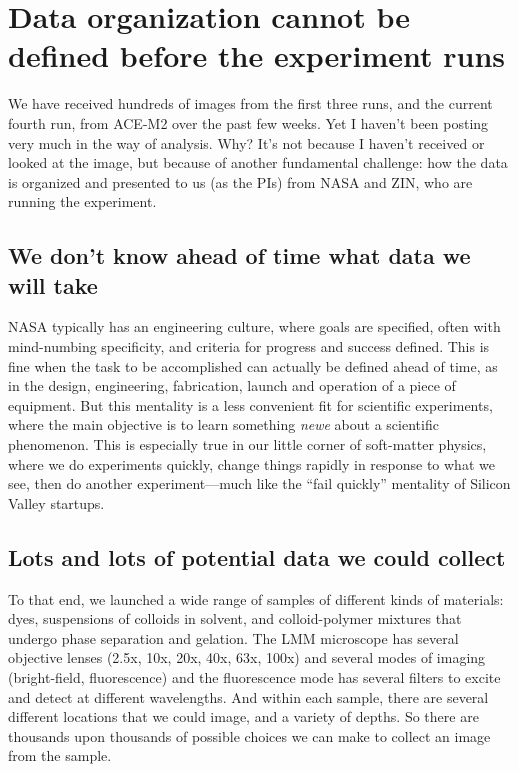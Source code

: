 \section{Data organization cannot be defined before the experiment runs}\hypertarget{data-organization-cannot-be-defined-before-the-experiment-runs}{}\label{data-organization-cannot-be-defined-before-the-experiment-runs}
We have received hundreds of images from the first three runs, and the current
fourth run, from ACE-M2 over the past few weeks. Yet I haven't been posting very
much in the way of analysis. Why? It's not because I haven't received or looked
at the image, but because of another fundamental challenge: how the data is
organized and presented to us (as the PIs) from NASA and ZIN, who are running
the experiment.

\subsection{We don't know ahead of time what data we will take}\hypertarget{we-dont-know-ahead-of-time-what-data-we-will-take}{}\label{we-dont-know-ahead-of-time-what-data-we-will-take}
NASA typically has an engineering culture, where goals are specified, often with
mind-numbing specificity, and criteria for progress and success defined. This is
fine when the task to be accomplished can actually be defined ahead of time, as
in the design, engineering, fabrication, launch and operation of a piece of
equipment. But this mentality is a less convenient fit for scientific
experiments, where the main objective is to learn something \emph{newe} about a
scientific phenomenon. This is especially true in our little corner of
soft-matter physics, where we do experiments quickly, change things rapidly in
response to what we see, then do another experiment---much like the ``fail
quickly'' mentality of Silicon Valley startups.

\subsection{Lots and lots of potential data we could collect}\hypertarget{lots-and-lots-of-potential-data-we-could-collect}{}\label{lots-and-lots-of-potential-data-we-could-collect}
To that end, we launched a wide range of samples of different kinds of
materials: dyes, suspensions of colloids in solvent, and colloid-polymer
mixtures that undergo phase separation and gelation. The LMM microscope has
several objective lenses (2.5x, 10x, 20x, 40x, 63x, 100x) and several modes of
imaging (bright-field, fluorescence) and the fluorescence mode has several
filters to excite and detect at different wavelengths. And within each sample,
there are several different locations that we could image, and a variety of
depths. So there are thousands upon thousands of possible choices we can make to
collect an image from the sample.

